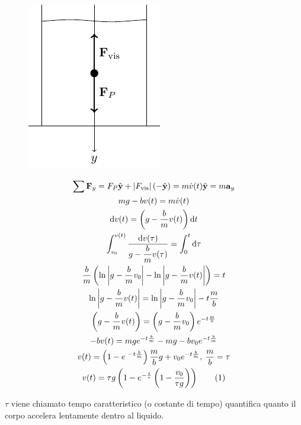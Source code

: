 \documentclass{article}
\newcommand{\vect}[1]{\boldsymbol{\mathbf{#1}}}
\newcommand{\df}{\mathrm{d}}
\numberwithin{equation}{subsection}
\begin{document}
\begin{figure}[H]%
    \centering
    \includegraphics{attrito-viscoso.pdf}%
\end{figure}
\begin{gather*}
    \sum\vect{F}_y=F_P\hat{\vect{y}}+\left|F_\mathrm{vis}\right|(-\hat{\vect{y}})=m\dot v(t)\hat{\vect{y}}=m\vect{a}_y\\
    mg-bv(t)=m\dot v(t)\\
    \df v(t)=\left(g-\displaystyle\frac{b}{m}v(t)\right)\df t\\
    \displaystyle\int_{v_0}^{v(t)}\frac{\df v(\tau)}{g-\displaystyle\frac{b}{m}v(\tau)}=\int_{0}^{t}\df\tau\\
    \displaystyle\frac{b}{m}\left(\ln\left|g-\displaystyle\frac{b}{m} v_0\right|-\ln\left|g-\displaystyle\frac{b}{m} v(t)\right|\right)=t\\
    \displaystyle \ln\left|g-\displaystyle\frac{b}{m}v(t)\right|=\ln\left|g-\displaystyle\frac{b}{m} v_0\right|-t\frac{m}{b}\\
    \left(g-\displaystyle\frac{b}{m} v(t)\right)=\left(g-\frac{b}{m}v_0\right)e^{ -t\frac{m}{b}}\\
    -bv(t)=mge^{ -t\frac{b}{m}}-mg-bv_0e^{ -t\frac{b}{m}}\\
    v(t)=\left(1-e^{\ -t\frac{b}{m}}\right)\displaystyle\frac{m}{b}g+v_0e^{ -t\frac{b}{m}},\:\frac{m}{b}=\tau\\
    v(t)=\tau g\left(1-e^{ -\frac{t}{\tau}}\left(1-\displaystyle\frac{v_0}{\tau g}\right)\right)\tag{\stepcounter{equation}\theequation}
\end{gather*}

$\tau$ viene chiamato tempo caratteristico (o costante di tempo) 
quantifica quanto il corpo accelera lentamente dentro al liquido. 
\end{document}
